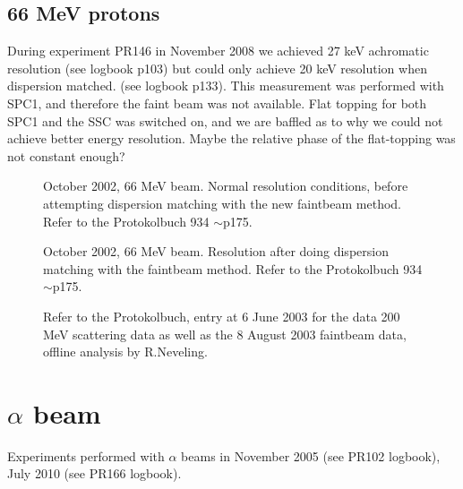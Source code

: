 \documentclass[11pt]{report}
\begin{document}
\subsection{66 MeV protons}\label{sec:66MeVprotons}

During experiment PR146 in November 2008 we achieved 27 keV achromatic resolution
(see logbook p103) but could only achieve 20 keV resolution when dispersion matched.
(see logbook p133).
This measurement was performed with SPC1, and therefore the faint beam was not available.
Flat topping for both SPC1 and the SSC was switched on, and we are baffled as to why we could
not achieve better energy resolution. Maybe the relative phase of the flat-topping was
not constant enough?


\begin{figure}[!ht]
\centerline{\vspace{0cm}\hspace{0cm}
}
\centering
\caption{October 2002, 66 MeV beam.
Normal resolution conditions, before attempting dispersion matching with the new
faintbeam method.
Refer to the Protokolbuch 934 $\sim$p175.}
\label{fig:66mev-resolution1}
\end{figure} 


\begin{figure}[!ht]
\centerline{\vspace{0cm}\hspace{0cm}
}
\centering
\caption{October 2002, 66 MeV beam.
Resolution after doing dispersion matching with the faintbeam method.
Refer to the Protokolbuch 934 $\sim$p175.
}
\label{fig:66mev-resolution2}
\end{figure} 


\begin{figure}[!ht]
\centerline{\vspace{0cm}\hspace{0cm}
}
\centering
\caption{Refer to the Protokolbuch, entry at 6 June 2003 for the data 200 MeV scattering
data as well as the 8 August 2003 faintbeam data, offline analysis by R.Neveling.}
\label{fig:200mev-resolution}
\end{figure} 

\section{$\alpha$ beam}
Experiments performed with $\alpha$ beams in November 2005 (see PR102 logbook), July 2010 (see PR166 logbook).
\end{document}
